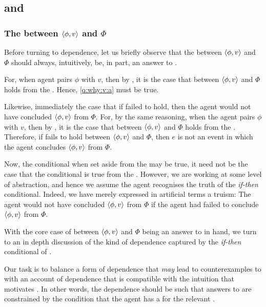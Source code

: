 \subsection{\qWhyVnP{} and \qWhyV{}}
\label{cha:var:expand:qWhy:variant}

\subsubsection{The \ros{} between \(\langle \phi, v \rangle\) and \(\Phi\)}

\begin{note}
  Before turning to dependence, let us briefly observe that the \ros{} between \(\langle \phi, v \rangle\) and \(\Phi\) should always, intuitively, be, in part, an answer to \qWhyV{}.

  For, when agent pairs \(\phi\) with \(v\), then by \supportI{}, it is the case that \ros{} between \(\langle \phi, v \rangle\) and \(\Phi\) holds from the \agpe{}.
  Hence, \ref{q:why:v:a} must be true.

  Likewise, immediately the case that if \support{} failed to hold, then the agent would not have concluded \(\langle \phi, v \rangle\) from \(\Phi\).
  For, by the same reasoning, when the agent pairs \(\phi\) with \(v\), then by \supportI{}, it is the case that \ros{} between \(\langle \phi, v \rangle\) and \(\Phi\) holds from the \agpe{}.
  Therefore, if \support{} fails to hold between \(\langle \phi, v \rangle\) and \(\Phi\), then \(e\) is not an event in which the agent concludes \(\langle \phi, v \rangle\) from \(\Phi\).

  Now, the conditional when set aside from the \agpe{} may be true, it need not be the case that the conditional is true from the \agpe{}.
  However, we are working at some level of abstraction, and hence we assume the agent recognises the truth of the \emph{if-then} conditional.
  Indeed, we have merely expressed in artificial terms a truism:
  The agent would not have concluded \(\langle \phi, v \rangle\) from \(\Phi\) if the agent had failed to conclude \(\langle \phi, v \rangle\) from \(\Phi\).
\end{note}

\begin{note}
  With the core case of \support{} between \(\langle \phi, v \rangle\) and \(\Phi\) being an answer to \qWhyV{} in hand, we turn to an in depth discussion of the kind of dependence captured by the \emph{if-then} conditional of \qWhyV{}.

  Our task is to balance a form of dependence that \emph{may} lead to counterexamples to \issueInclusion{} with an account of dependence that is compatible with the intuition that motivates \issueInclusion{}.
  In other words, the dependence should be such that answers to \qWhyV{} are constrained by the condition that the agent has a \wit{} for the relevant \ros{}.
\end{note}

